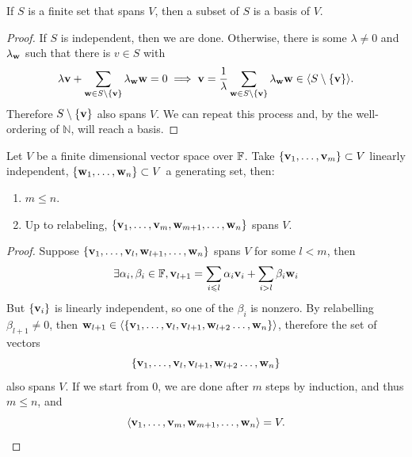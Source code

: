 \documentclass[a4paper,11pt]{article}
\begin{document}
\begin{lemma}
    If $S$ is a finite set that spans $V$, then a subset of $S$ is a basis of $V$.
\end{lemma}
\begin{proof}
    If $S$ is independent, then we are done.
    Otherwise, there is some $\lambda\neq 0$ and $\lambda_{\bf w}$ such that there is $v\in S$ with
    $$\lambda {\bf v}+\sum_{{\bf w}\in S\setminus\{{\bf v}\}}\lambda_{\bf w}{\bf w}=0\implies {\bf v}=\frac{1}{\lambda}\sum_{{\bf w}\in S\setminus\{{\bf v}\}}\lambda_{\bf w}{\bf w}\in\langle S\setminus\{{\bf v}\}\rangle.$$
    Therefore $S\setminus\{{\bf v}\}$ also spans $V$.
    We can repeat this process and, by the well-ordering of $\mathbb N$, will reach a basis.
\end{proof}
\begin{theorem}\label{thm:steinitz}
    Let $V$ be a finite dimensional vector space over ${\mathbb{F}}$. Take $\{{\bf v}_1,\ldots,{\bf v}_m\}\subset V$ linearly independent, $\{{\bf w}_1,\ldots,{\bf w}_n\}\subset V$ a generating set, then:
    \begin{enumerate}
        \item $m\le n$.
        \item Up to relabeling, $\{{\bf v}_1,\ldots,{\bf v}_m,{\bf w}_{m+1},\ldots,{\bf w}_n\}$ spans $V$.
    \end{enumerate}
\end{theorem}
\begin{proof}
    Suppose $\{{\bf v}_1,\ldots,{\bf v}_l,{\bf w}_{l+1},\ldots,{\bf w}_n\}$ spans $V$ for some $l<m$, then
    $$\exists\alpha_i,\beta_i\in {\mathbb{F}}, {\bf v}_{l+1}=\sum_{i\leqslant l}\alpha_i{\bf v}_i+\sum_{i>l}\beta_i{\bf w}_i$$
    But $\{{\bf v}_i\}$ is linearly independent, so one of the $\beta_i$ is nonzero.
    By relabelling $\beta_{l+1}\neq 0$, then ${\bf w}_{l+1}\in\langle\{{\bf v}_1,\ldots,{\bf v}_l,{\bf v}_{l+1},{\bf w}_{l+2}\ldots,{\bf w}_n\}\rangle$, therefore the set of vectors 
    \[
        \{{\bf v}_1,\ldots,{\bf v}_l,{\bf v}_{l+1},{\bf w}_{l+2}\ldots,{\bf w}_n\}
    \]
    also spans $V$. If we start from 0, we are done after $m$ steps by induction, and thus $m\le n$, and
    \[
        \langle {\bf v}_1,\ldots,{\bf v}_m,{\bf w}_{m+1},\ldots,{\bf w}_n \rangle =V.\qedhere
    \]
\end{proof}
\end{document}
